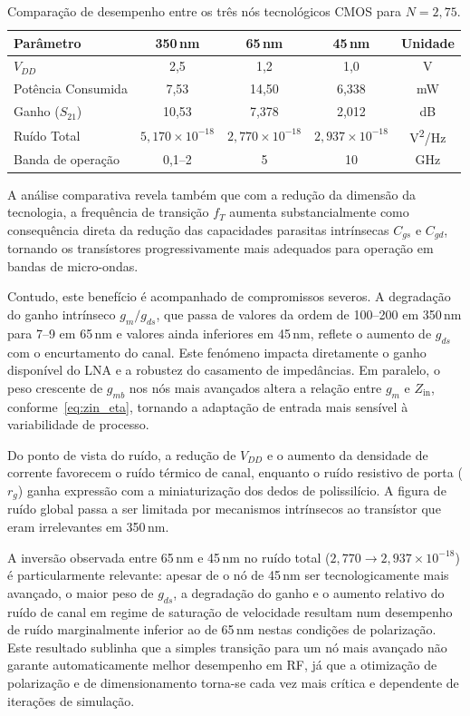 \begin{table}[H]
\centering
\caption{Comparação de desempenho entre os três nós tecnológicos CMOS para $N = 2{,}75$.}
\label{tab:comp_tecnologias}
\begin{tabular}{lcccc}
\hline
\textbf{Parâmetro}       & \textbf{350\,nm} & \textbf{65\,nm} & \textbf{45\,nm} & \textbf{Unidade} \\
\hline
$V_{DD}$                 & 2{,}5 & 1{,}2 & 1{,}0 & V \\
Potência Consumida       & 7{,}53 & 14{,}50 & 6{,}338 & mW \\
Ganho ($S_{21}$)         & 10{,}53 & 7{,}378 & 2{,}012 & dB \\
Ruído Total              & $5{,}170 \times 10^{-18}$ & $2{,}770 \times 10^{-18}$ & $2{,}937 \times 10^{-18}$ & V\textsuperscript{2}/Hz \\
Banda de operação        & 0{,}1--2 & 5 & 10 & GHz \\
\hline
\end{tabular}
\end{table}

A análise comparativa revela também que com a redução da dimensão da tecnologia, 
a frequência de transição $f_T$ aumenta substancialmente como consequência direta da redução das 
capacidades parasitas intrínsecas $C_{gs}$ e $C_{gd}$, tornando os transístores progressivamente 
mais adequados para operação em bandas de micro-ondas.

Contudo, este benefício é acompanhado de compromissos severos. A degradação do ganho intrínseco
$g_m/g_{ds}$, que passa de valores da ordem de 100--200 em 350\,nm para 7--9 em 65\,nm e valores
ainda inferiores em 45\,nm, reflete o aumento de $g_{ds}$ com o encurtamento do canal. Este fenómeno impacta 
diretamente o ganho disponível do LNA e a robustez do casamento de impedâncias. Em paralelo, o peso crescente 
de $g_{mb}$ nos nós mais avançados altera a relação entre $g_m$ e $Z_{\text{in}}$, conforme~\eqref{eq:zin_eta}, 
tornando a adaptação de entrada mais sensível à variabilidade de processo.

Do ponto de vista do ruído, a redução de $V_{DD}$ e o aumento da densidade de corrente favorecem o
ruído térmico de canal, enquanto o ruído resistivo de porta ($r_g$) ganha expressão com a miniaturização
dos dedos de polissilício. A figura de ruído global passa a ser limitada por mecanismos intrínsecos ao
transístor que eram irrelevantes em 350\,nm.

A inversão observada entre 65\,nm e 45\,nm no ruído total ($2{,}770 \to 2{,}937 \times 10^{-18}$) é
particularmente relevante: apesar de o nó de 45\,nm ser tecnologicamente mais avançado, o maior peso
de $g_{ds}$, a degradação do ganho e o aumento relativo do ruído de canal em regime de saturação de
velocidade resultam num desempenho de ruído marginalmente inferior ao de 65\,nm nestas condições de
polarização. Este resultado sublinha que a simples transição para um nó mais avançado não garante
automaticamente melhor desempenho em RF, já que a otimização de polarização e de dimensionamento torna-se
cada vez mais crítica e dependente de iterações de simulação.

